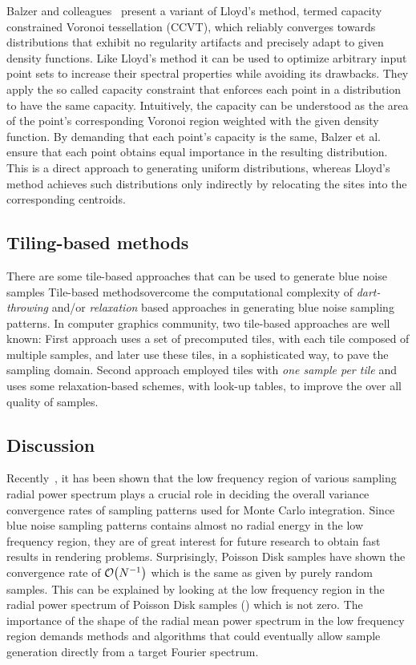Balzer and colleagues~\cite{Balzer:2009:CPD:1531326.1531392} present a variant of Lloyd’s method, termed capacity constrained Voronoi 
tessellation (CCVT), which reliably converges towards distributions that exhibit no regularity artifacts and precisely adapt 
to given density functions. Like Lloyd’s 
method it can be used to optimize arbitrary input point sets to increase their spectral properties while avoiding its 
drawbacks. They apply the so called capacity constraint that enforces each point in a distribution to have the same 
capacity. Intuitively, the capacity can be understood as the area of the point’s corresponding Voronoi region weighted with 
the given density function. By demanding that each point’s capacity is the same, Balzer et al. ensure that each point 
obtains equal importance in the resulting distribution. This is a direct approach to generating uniform 
distributions, whereas Lloyd’s method achieves such distributions only indirectly by relocating the sites into the 
corresponding centroids.

\subsection{Tiling-based methods}

There are some tile-based approaches that can be used to generate blue noise samples 
Tile-based methodsovercome the computational complexity of  
\emph{dart-throwing} and/or \emph{relaxation} based approaches in generating blue noise sampling patterns. In computer graphics community, two tile-based approaches are well known: First approach uses a set of precomputed tiles, with each tile composed of multiple samples, and later use these tiles, in a sophisticated way, to pave the sampling domain. Second approach employed tiles with \emph{one sample per tile} and uses some relaxation-based schemes, with look-up tables, to improve the over all quality of samples. 

\subsection{Discussion}

Recently~\cite{Pilleboue:2015:VAM}, it has been shown that the low frequency region of various sampling 
radial power spectrum plays a crucial role in deciding the overall variance convergence rates of sampling 
patterns used for Monte Carlo integration. Since blue noise sampling patterns contains almost no radial 
energy in the low frequency region, they are of great interest for future research to obtain fast results in 
rendering problems. Surprisingly, Poisson Disk samples have shown the convergence rate of $\mathcal{O}\!\left(N^{-1}\right)$ which is the same as given by purely random samples. This can be explained by looking at the low frequency region in the radial power spectrum of Poisson Disk samples () which is not zero.
The importance of the shape of the radial mean power spectrum in the  low frequency region demands  methods and algorithms that could eventually allow sample generation directly from a target Fourier spectrum.